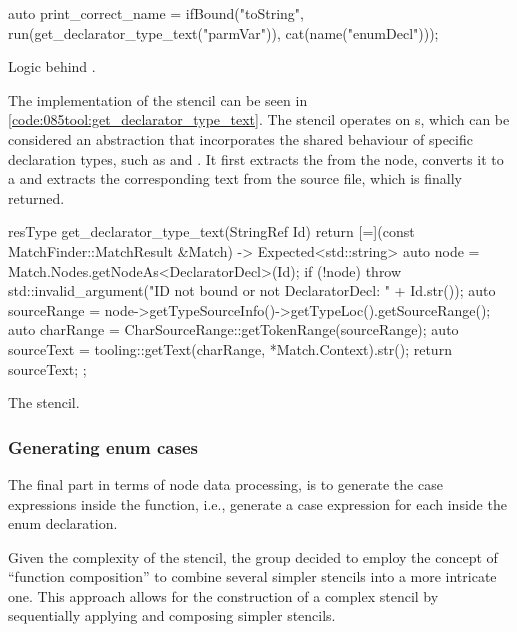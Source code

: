 \begin{listing}[H]
    \begin{cppcode}
auto print_correct_name = ifBound("toString",
    run(get_declarator_type_text("parmVar")),
    cat(name("enumDecl")));
    \end{cppcode}
    \caption{Logic behind .}
    \label{code:085tool:print_correct_name}
\end{listing}

The implementation of the stencil  can be seen in \cref{code:085tool:get_declarator_type_text}.
The stencil operates on s, which can be considered an abstraction that incorporates the shared behaviour of specific declaration types, such as  and .
It first extracts the  from the node, converts it to a  and extracts the corresponding text from the source file, which is finally returned.

\begin{listing}[H]
    \begin{cppcode}
resType get_declarator_type_text(StringRef Id) {
return [=](const MatchFinder::MatchResult &Match) -> Expected<std::string> {
    auto node = Match.Nodes.getNodeAs<DeclaratorDecl>(Id);
    if (!node) {
        throw std::invalid_argument("ID not bound or not DeclaratorDecl: " + Id.str());
    }
    auto sourceRange = node->getTypeSourceInfo()->getTypeLoc().getSourceRange();
    auto charRange = CharSourceRange::getTokenRange(sourceRange);
    auto sourceText = tooling::getText(charRange, *Match.Context).str();
    return sourceText;
};
}
    \end{cppcode}
    \caption{The  stencil.}
    \label{code:085tool:get_declarator_type_text}
\end{listing}

\subsubsection*{Generating enum cases}
The final part in terms of node data processing, is to generate the case expressions inside the  function, i.e., generate a case expression for each  inside the enum declaration.

Given the complexity of the stencil, the group decided to employ the concept of ``function composition'' to combine several simpler stencils into a more intricate one.
This approach allows for the construction of a complex stencil by sequentially applying and composing simpler stencils.

